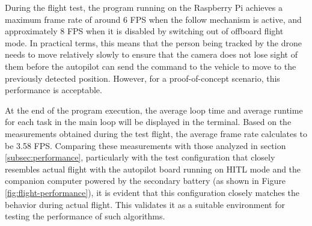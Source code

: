 During the flight test, the program running on the Raspberry Pi achieves a maximum frame rate of around 6 FPS when the follow mechanism is active, and approximately 8 FPS when it is disabled by switching out of offboard flight mode. In practical terms, this means that the person being tracked by the drone needs to move relatively slowly to ensure that the camera does not lose sight of them before the autopilot can send the command to the vehicle to move to the previously detected position. However, for a proof-of-concept scenario, this performance is acceptable.

At the end of the program execution, the average loop time and average runtime for each task in the main loop will be displayed in the terminal. Based on the measurements obtained during the test flight, the average frame rate calculates to be 3.58 FPS. Comparing these measurements with those analyzed in section \ref{subsec:performance}, particularly with the test configuration that closely resembles actual flight with the autopilot board running on HITL mode and the companion computer powered by the secondary battery (as shown in Figure \ref{fig:flight-performance}), it is evident that this configuration closely matches the behavior during actual flight. This validates it as a suitable environment for testing the performance of such algorithms.

